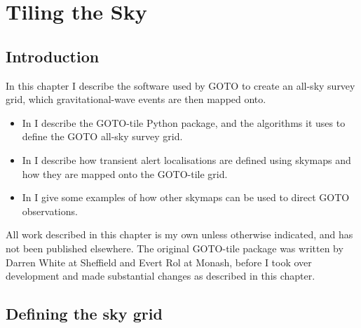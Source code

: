 
\chapter{Tiling the Sky}
\label{chap:tiling}


\chaptoc{}


\section{Introduction}
\label{sec:tiling_intro}


\begin{colsection}

In this chapter I describe the software used by GOTO to create an all-sky survey grid, which gravitational-wave events are then mapped onto.
%
\begin{itemize}
    \item In  I describe the GOTO-tile Python package, and the algorithms it uses to define the GOTO all-sky survey grid.
    \item In  I describe how transient alert localisations are defined using skymaps and how they are mapped onto the GOTO-tile grid.
    \item In  I give some examples of how other skymaps can be used to direct GOTO observations.
\end{itemize}
%
All work described in this chapter is my own unless otherwise indicated, and has not been published elsewhere. The original GOTO-tile package was written by Darren White at Sheffield and Evert Rol at Monash, before I took over development and made substantial changes as described in this chapter.

\end{colsection}


\section{Defining the sky grid}
\label{sec:gototile}


